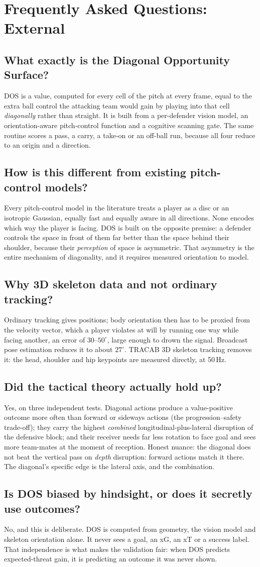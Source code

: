 \documentclass[11pt]{article}
\newcommand{\faq}[1]{\subsection{#1}}
\begin{document}
\section{Frequently Asked Questions: External}

\faq{What exactly is the Diagonal Opportunity Surface?}
DOS is a value, computed for every cell of the pitch at every frame, equal
to the extra ball control the attacking team would gain by playing into
that cell \emph{diagonally} rather than straight. It is built from a
per-defender vision model, an orientation-aware pitch-control function and
a cognitive scanning gate. The same routine scores a pass, a carry, a
take-on or an off-ball run, because all four reduce to an origin and a
direction.

\faq{How is this different from existing pitch-control models?}
Every pitch-control model in the literature treats a player as a disc or an
isotropic Gaussian, equally fast and equally aware in all directions.
None encodes which way the player is facing. DOS is built on the opposite
premise: a defender controls the space in front of them far better than the
space behind their shoulder, because their \emph{perception} of space is
asymmetric. That asymmetry is the entire mechanism of diagonality, and it
requires measured orientation to model.

\faq{Why 3D skeleton data and not ordinary tracking?}
Ordinary tracking gives positions; body orientation then has to be
proxied from the velocity vector, which a player violates at will by
running one way while facing another, an error of $30$--$50^\circ$, large
enough to drown the signal. Broadcast pose estimation reduces it to about
$27^\circ$. TRACAB 3D skeleton tracking removes it: the head, shoulder and
hip keypoints are measured directly, at 50\,Hz.

\faq{Did the tactical theory actually hold up?}
Yes, on three independent tests. Diagonal actions produce a value-positive
outcome more often than forward or sideways actions (the
progression--safety trade-off); they carry the highest \emph{combined}
longitudinal-plus-lateral disruption of the defensive block; and their
receiver needs far less rotation to face goal and sees more team-mates at
the moment of reception. Honest nuance: the diagonal does not beat the
vertical pass on \emph{depth} disruption: forward actions match it there.
The diagonal's specific edge is the lateral axis, and the combination.

\faq{Is DOS biased by hindsight, or does it secretly use outcomes?}
No, and this is deliberate. DOS is computed from geometry, the vision model
and skeleton orientation alone. It never sees a goal, an xG, an xT or a
success label. That independence is what makes the validation fair: when
DOS predicts expected-threat gain, it is predicting an outcome it was never
shown.
\end{document}
